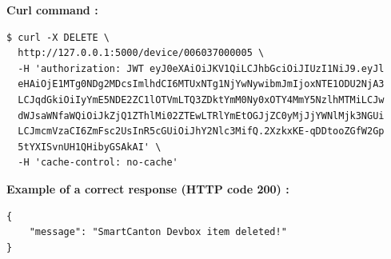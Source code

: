 \newpage
\textbf{Curl command :}

\begin{tcolorbox}[top=-3mm, bottom=-3mm, left=0mm, right=0mm, enhanced, breakable, colback=LightGray, colframe=DarkGray, colbacktitle=DarkGray]
\begin{verbatim}
$ curl -X DELETE \
  http://127.0.0.1:5000/device/006037000005 \
  -H 'authorization: JWT eyJ0eXAiOiJKV1QiLCJhbGciOiJIUzI1NiJ9.eyJl
  eHAiOjE1MTg0NDg2MDcsImlhdCI6MTUxNTg1NjYwNywibmJmIjoxNTE1ODU2NjA3
  LCJqdGkiOiIyYmE5NDE2ZC1lOTVmLTQ3ZDktYmM0Ny0xOTY4MmY5NzlhMTMiLCJw
  dWJsaWNfaWQiOiJkZjQ1ZThlMi02ZTEwLTRlYmEtOGJjZC0yMjJjYWNlMjk3NGUi
  LCJmcmVzaCI6ZmFsc2UsInR5cGUiOiJhY2Nlc3MifQ.2XzkxKE-qDDtooZGfW2Gp
  5tYXISvnUH1QHibyGSAkAI' \
  -H 'cache-control: no-cache'
\end{verbatim}
\end{tcolorbox}

\textbf{Example of a correct response (HTTP code 200) : }

\begin{tcolorbox}[top=-3mm, bottom=-3mm, left=0mm, right=0mm, enhanced, breakable, colback=LightGray, colframe=DarkGray, colbacktitle=DarkGray]
\begin{verbatim}
{
    "message": "SmartCanton Devbox item deleted!"
}
\end{verbatim}
\end{tcolorbox}

